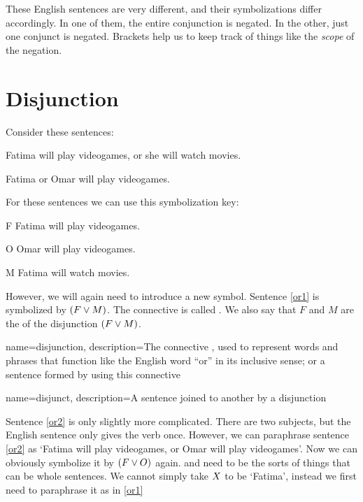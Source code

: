 These English sentences are very different, and their symbolizations differ accordingly. In one of them, the entire conjunction is negated. In the other, just one conjunct is negated. Brackets help us to keep track of things like the \emph{scope} of the negation. 

\section{Disjunction}

Consider these sentences:
	\begin{earg}
		\item[\ex{or1}] Fatima will play videogames, or she will watch movies.
		\item[\ex{or2}] Fatima or Omar will play videogames. 
	\end{earg}
For these sentences we can use this symbolization key:
	\begin{ekey}
		\item[F] Fatima will play videogames.
		\item[O] Omar will play videogames.
		\item[M] Fatima will watch movies.
	\end{ekey}
However, we will again need to introduce a new symbol. Sentence \ref{or1} is symbolized by $(F \vee M)$. The connective is called . We also say that $F$ and $M$ are the  of the disjunction $(F \vee M)$.

{
name=disjunction,
description={The connective \eor, used to represent words and phrases that function like the English word ``or'' in its inclusive sense; or a sentence formed by using this connective}
}

{
name=disjunct,
description={A sentence joined to another by a \gls{disjunction}}
}

Sentence \ref{or2} is only slightly more complicated. There are two subjects, but the English sentence only gives the verb once. However, we can paraphrase sentence \ref{or2} as `Fatima will play videogames, or Omar will play videogames'. Now we can obviously symbolize it by $(F \vee O)$ again.
\metaX and \metaY need to be the sorts of things that can be whole sentences. We cannot simply take $X$ to be `Fatima', instead we first need to paraphrase it as in \ref{or1}
	
